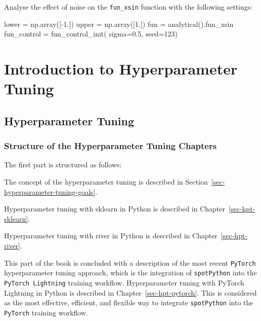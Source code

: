 \documentclass[
  letterpaper,
  DIV=11,
  numbers=noendperiod]{scrreprt}
\newenvironment{Shaded}{\begin{snugshade}}{\end{snugshade}}
\newcommand{\DecValTok}[1]{\textcolor[rgb]{0.68,0.00,0.00}{#1}}
\newcommand{\FloatTok}[1]{\textcolor[rgb]{0.68,0.00,0.00}{#1}}
\newcommand{\NormalTok}[1]{\textcolor[rgb]{0.00,0.23,0.31}{#1}}
\newcommand{\OperatorTok}[1]{\textcolor[rgb]{0.37,0.37,0.37}{#1}}
\begin{document}
Analyse the effect of noise on the \texttt{fun\_xsin} function with the
following settings:

\begin{Shaded}
\begin{Highlighting}[]
\NormalTok{lower }\OperatorTok{=}\NormalTok{ np.array([}\OperatorTok{{-}}\FloatTok{1.}\NormalTok{])}
\NormalTok{upper }\OperatorTok{=}\NormalTok{ np.array([}\FloatTok{1.}\NormalTok{])}
\NormalTok{fun }\OperatorTok{=}\NormalTok{ analytical().fun\_xsin}
\NormalTok{fun\_control }\OperatorTok{=}\NormalTok{ fun\_control\_init(    }
\NormalTok{    sigma}\OperatorTok{=}\FloatTok{0.5}\NormalTok{,}
\NormalTok{    seed}\OperatorTok{=}\DecValTok{123}\NormalTok{)}
\end{Highlighting}
\end{Shaded}

\part{Introduction to Hyperparameter Tuning}

\hypertarget{hyperparameter-tuning}{%
\chapter{Hyperparameter Tuning}\label{hyperparameter-tuning}}

\hypertarget{structure-of-the-hyperparameter-tuning-chapters}{%
\section{Structure of the Hyperparameter Tuning
Chapters}\label{structure-of-the-hyperparameter-tuning-chapters}}

The first part is structured as follows:

The concept of the hyperparameter tuning is described in
Section~\ref{sec-hyperparameter-tuning-goals}.

Hyperparameter tuning with sklearn in Python is described in
Chapter~\ref{sec-hpt-sklearn}.

Hyperparameter tuning with river in Python is described in
Chapter~\ref{sec-hpt-river}.

This part of the book is concluded with a description of the most recent
\texttt{PyTorch} hyperparameter tuning approach, which is the
integration of \texttt{spotPython} into the \texttt{PyTorch\ Lightning}
training workflow. Hyperparameter tuning with PyTorch Lightning in
Python is described in Chapter~\ref{sec-hpt-pytorch}. This is considered
as the most effective, efficient, and flexible way to integrate
\texttt{spotPython} into the \texttt{PyTorch} training workflow.
\end{document}
